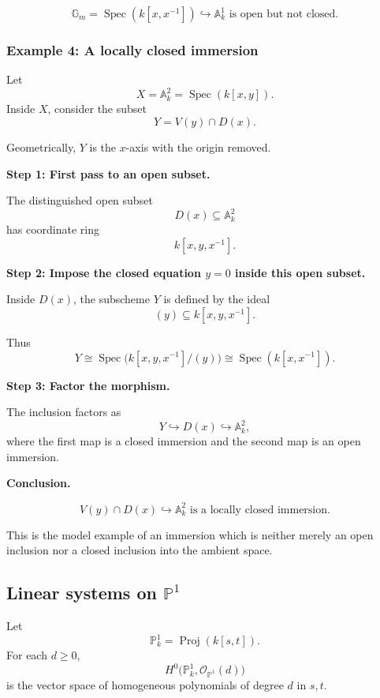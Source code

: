 \documentclass[12pt,a4paper]{article}
\theoremstyle{notespace}
\begin{document}
\[
\boxed{
	\mathbb{G}_{m}
	=
	\operatorname{Spec}(k[x,x^{-1}])
	\hookrightarrow
	\mathbb{A}^{1}_{k}
	\text{ is open but not closed.}
}
\]

\subsubsection{Example 4: A locally closed immersion}

Let
\[
X=\mathbb{A}^{2}_{k}=\operatorname{Spec}(k[x,y]).
\]
Inside \(X\), consider the subset
\[
Y=V(y)\cap D(x).
\]

Geometrically, \(Y\) is the \(x\)-axis with the origin removed.

\textbf{Step 1: First pass to an open subset.}

The distinguished open subset
\[
D(x)\subseteq \mathbb{A}^{2}_{k}
\]
has coordinate ring
\[
k[x,y,x^{-1}].
\]

\textbf{Step 2: Impose the closed equation \(y=0\) inside this open subset.}

Inside \(D(x)\), the subscheme \(Y\) is defined by the ideal
\[
(y)\subseteq k[x,y,x^{-1}].
\]

Thus
\[
Y
\cong
\operatorname{Spec}\bigl(k[x,y,x^{-1}]/(y)\bigr)
\cong
\operatorname{Spec}(k[x,x^{-1}]).
\]

\textbf{Step 3: Factor the morphism.}

The inclusion factors as
\[
Y
\hookrightarrow
D(x)
\hookrightarrow
\mathbb{A}^{2}_{k},
\]
where the first map is a closed immersion and the second map is an open immersion.

\textbf{Conclusion.}

\[
\boxed{
	V(y)\cap D(x)
	\hookrightarrow
	\mathbb{A}^{2}_{k}
	\text{ is a locally closed immersion.}
}
\]

This is the model example of an immersion which is neither merely an open inclusion nor a closed inclusion into the ambient space.

\subsection{Linear systems on \texorpdfstring{\(\mathbb{P}^{1}\)}{P1}}

Let
\[
\mathbb{P}^{1}_{k}
=
\operatorname{Proj}(k[s,t]).
\]
For each \(d\geq 0\),
\[
H^{0}\bigl(\mathbb{P}^{1}_{k},\mathcal{O}_{\mathbb{P}^{1}}(d)\bigr)
\]
is the vector space of homogeneous polynomials of degree \(d\) in \(s,t\).
\end{document}
